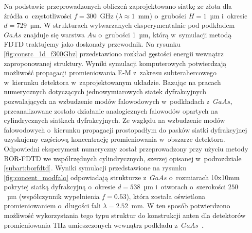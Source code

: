 Na podstawie przeprowadzonych obliczeń zaprojektowano siatkę ze złota dla źródła o~częstotliwości $f=300$~GHz ($\lambda\approx 1$~mm) o~grubości $H=1$~µm i~okresie $d=729$~µm. W strukturach wytwarzanych eksperymentalnie pod podkładem $GaAs$ znajduje się warstwa $Au$ o~grubości 1~µm, którą w~symulacji metodą FDTD traktujemy jako doskonały przewodnik. Na rysunku \ref{fig:consrc_1d_f300Ghz} przedstawiono rozkład gęstości energii wewnątrz zaproponowanej struktury. Wyniki symulacji komputerowych potwierdzają  możliwość propagacji promieniowania E-M z~zakresu subterahercowego w~kierunku detektora w~zaprojektowanym układzie.
Bazując na pracach numerycznych dotyczących  jednowymiarowych siatek dyfrakcyjnych pozwalających na wzbudzenie modów falowodowych w~podkładach z~$GaAs$, przeanalizowane zostało działanie analogicznych falowodów opartych na cylindrycznych siatkach dyfrakcyjnych. Ze względu na wzbudzenie modów falowodowych o~kierunku propagacji prostopadłym do pasków siatki dyfrakcyjnej uzyskujemy częściową koncentrację promieniowania w~obszarze detektora. Odpowiedni eksperyment numeryczny został przeprowadzony przy użyciu metody BOR-FDTD we współrzędnych cylindrycznych, szerzej opisanej w~podrozdziale \ref{subart:borfdtd}. Wyniki symulacji przedstawione na rysunku \ref{fig:concent_modfalo} odpowiadają strukturze z~$GaAs$ o~rozmiarach 10x10mm pokrytej siatką dyfrakcyjną o~okresie $d=538$~µm i~otworach o~szerokości $250$~µm (współczynnik wypełnienia $f=0.53$), która została oświetlona promieniowaniem o~długości fali $\lambda=2.52$~mm. W ten sposób potwierdzono możliwość wykorzystania tego typu struktur do konstrukcji anten dla detektorów promieniowania THz umieszczonych wewnątrz podkładu z~$GaAs$~\cite{Stolarek2011}.

